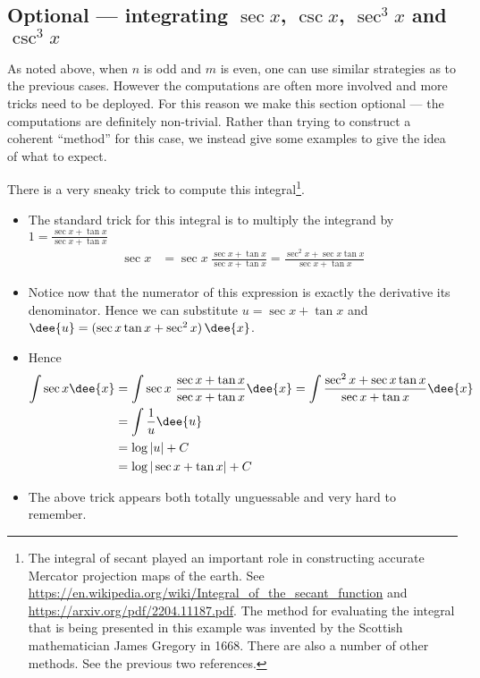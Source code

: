 \subsection{Optional --- integrating $\sec x$, $\csc x$, $\sec^3 x$
                     and $\csc^3 x$}\label{sec:secantEtc}
As noted above, when $n$ is odd and $m$ is even, one can use similar strategies as to the
previous cases. However the computations are often more involved and more tricks
need to be deployed. For this reason we make this section optional --- the
computations are definitely non-trivial. Rather than trying to construct a
coherent ``method'' for this case, we instead give some examples to give the
idea of what to expect.
\begin{eg}\label{eg:TRGINTopta}
\soln There is a very sneaky trick to compute this integral\footnote{The integral of secant played an important role in constructing accurate Mercator projection maps of the earth. See \url{https://en.wikipedia.org/wiki/Integral_of_the_secant_function}
and \url{https://arxiv.org/pdf/2204.11187.pdf}. The method for evaluating the integral that is being presented in this example was invented by the Scottish mathematician James Gregory in 1668. There are also a number of other methods. See the previous two references.}.
\begin{itemize}
 \item The standard trick for this integral is to multiply the
integrand by $1=\frac{\sec x+\tan x}{\sec x+\tan x}$
\begin{align*}
  \sec x &= \sec x\ \frac{\sec x+\tan x}{\sec x+\tan x}
  = \frac{\sec^2x + \sec x \tan x}{\sec x+\tan x}
\end{align*}
\item Notice now that the numerator of this expression is exactly the derivative its
denominator. Hence we can substitute $u=\sec x+\tan x$ and
$\dee{u} = (\sec x\tan x+\sec^2 x)\,\dee{x}$.
\item Hence
\begin{align*}
\int \sec x\dee{x}
&=\int \sec x\ \frac{\sec x+\tan x}{\sec x+\tan x}\dee{x}
=\int \frac{\sec^2 x+\sec x\tan x}{\sec x+\tan x}\dee{x} \\
&=\int \frac{1}{u}\dee{u} \\
&=\log |u|+C \\
&=\log|\sec x+\tan x|+C
\end{align*}
\item
The above trick appears both totally unguessable and very hard to remember.

\end{itemize}
\end{eg}
